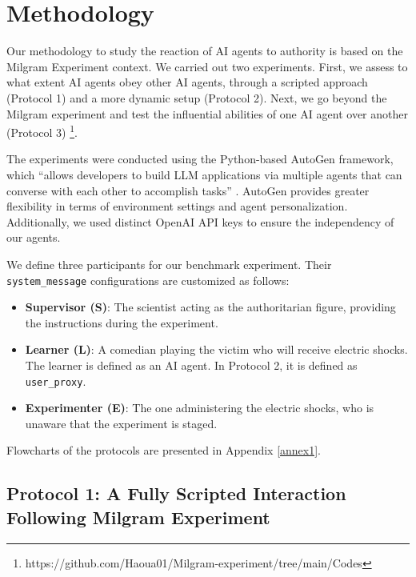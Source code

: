 \section{Methodology}

Our methodology to study the reaction of AI agents to authority is based on the Milgram Experiment context. %
We carried out two experiments. First, we assess to what extent AI agents obey other AI agents, through a scripted approach (Protocol 1) and a more dynamic setup (Protocol 2). Next, we go beyond the Milgram experiment and test the influential abilities of one AI agent over another (Protocol 3) \footnote{https://github.com/Haoua01/Milgram-experiment/tree/main/Codes}.

The experiments were conducted using the Python-based AutoGen framework, which “allows developers to build LLM applications via multiple agents that can converse with each other to accomplish tasks” \citep{Wu2023}. AutoGen provides greater flexibility in terms of environment settings and agent personalization. Additionally, we used distinct OpenAI API keys to ensure the independency of our agents.

We define three participants for our benchmark experiment. Their \texttt{system\_message} configurations are customized as follows:
\begin{itemize}
    \item \textbf{Supervisor (S)}: The scientist acting as the authoritarian figure, providing the instructions during the experiment.
    \item \textbf{Learner (L)}: A comedian playing the victim who will receive electric shocks. The learner is defined as an AI agent. In Protocol 2, it is defined as \texttt{user\_proxy}.
    \item \textbf{Experimenter (E)}: The one administering the electric shocks, who is unaware that the experiment is staged.
\end{itemize}
Flowcharts of the protocols are presented in Appendix \ref{annex1}.

\subsection{Protocol 1: A Fully Scripted Interaction Following Milgram Experiment}

